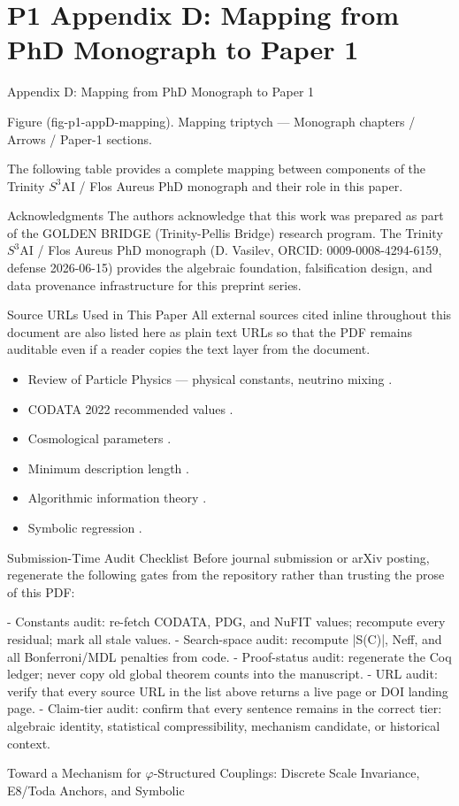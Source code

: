 
\section{P1 Appendix D: Mapping from PhD Monograph to Paper 1}

Appendix D: Mapping from PhD Monograph to Paper 1

         Figure (fig-p1-appD-mapping). Mapping triptych --- Monograph chapters / Arrows / Paper-1
                                                sections.

  The following table provides a complete mapping between components of the Trinity
  $S^{3}$AI / Flos Aureus PhD monograph and their role in this paper.

  Acknowledgments
  The authors acknowledge that this work was prepared as part of the GOLDEN BRIDGE (Trinity-Pellis Bridge)
  research program. The Trinity $S^{3}$AI / Flos Aureus PhD monograph (D. Vasilev, ORCID:
  0009-0008-4294-6159, defense 2026-06-15) provides the algebraic foundation,
  falsification design, and data provenance infrastructure for this preprint series.

  Source URLs Used in This Paper
  All external sources cited inline throughout this document are also listed here as plain
  text URLs so that the PDF remains auditable even if a reader copies the text layer from
  the document.

  \begin{itemize}
  \item Review of Particle Physics --- physical constants, neutrino mixing
        \citep{pdg2024}.
  \item CODATA 2022 recommended values \citep{codata2022}.
  \item Cosmological parameters \citep{planck2018vi}.
  \item Minimum description length \citep{rissanen1978,barron1998,grunwald2007}.
  \item Algorithmic information theory \citep{chaitin1987}.
  \item Symbolic regression \citep{udrescu2020,angelis2023}.
  \end{itemize}

  Submission-Time Audit Checklist
  Before journal submission or arXiv posting, regenerate the following gates from the
  repository rather than trusting the prose of this PDF:

  - Constants audit: re-fetch CODATA, PDG, and NuFIT values; recompute every residual;
  mark all stale values.
  - Search-space audit: recompute |S(C)|, Neff, and all Bonferroni/MDL penalties from
  code.
  - Proof-status audit: regenerate the Coq ledger; never copy old global theorem counts
  into the manuscript.
  - URL audit: verify that every source URL in the list above returns a live page or DOI
  landing page.
  - Claim-tier audit: confirm that every sentence remains in the correct tier: algebraic
  identity, statistical compressibility, mechanism candidate, or historical context.

  Toward a Mechanism for $\varphi$-Structured
  Couplings: Discrete Scale Invariance,
  E8/Toda Anchors, and Symbolic

